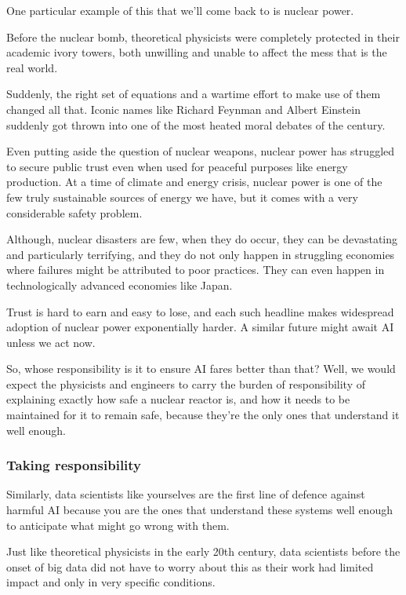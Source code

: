 \documentclass[
]{book}
\theoremstyle{definition}
\theoremstyle{definition}
\theoremstyle{definition}
\theoremstyle{definition}
\theoremstyle{remark}
\begin{document}
One particular example of this that we'll come back to is nuclear power.

Before the nuclear bomb, theoretical physicists were completely
protected in their academic ivory towers, both unwilling and unable to affect
the mess that is the real world.

Suddenly, the right set of equations and a wartime effort to make use of
them changed all that. Iconic names like Richard Feynman and Albert Einstein suddenly got thrown into one of the most heated moral debates of the century.

Even putting aside the question of nuclear weapons, nuclear power has struggled to secure public trust even when used for peaceful purposes like energy production. At a time of climate and energy crisis, nuclear power is one of the few truly sustainable sources of energy we have, but it comes with a very considerable safety problem.

Although, nuclear disasters are few, when they do occur, they can be
devastating and particularly terrifying, and they do not only happen
in struggling economies where failures might be attributed to poor practices.
They can even happen in technologically advanced economies like Japan.

Trust is hard to earn and easy to lose, and each such headline makes
widespread adoption of nuclear power exponentially harder. A similar future might await AI unless we act now.

So, whose responsibility is it to ensure AI fares better than that? Well, we would expect the physicists and engineers to carry the burden of responsibility of explaining exactly how safe a nuclear reactor is, and how it needs to be maintained for it to remain safe, because they're the only
ones that understand it well enough.

\hypertarget{taking-responsibility}{%
\subsubsection{Taking responsibility}\label{taking-responsibility}}

Similarly, data scientists like yourselves are the first line of defence against harmful AI because you are the ones that understand these systems well enough to anticipate what might go wrong with them.

Just like theoretical physicists in the early 20th century, data scientists before the onset of big data did not have to worry about this as their work had limited impact and only in very specific conditions.
\end{document}
